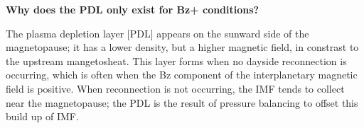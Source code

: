 \textbf{Why does the PDL only exist for Bz+ conditions?}

The plasma depletion layer [PDL] appears on the sunward side of the
magnetopause; it has a lower density, but a higher magnetic field, in
constrast to the upstream mangetosheat. This layer forms when no dayside
reconnection is occurring, which is often when the Bz component of the
interplanetary magnetic field is positive. When reconnection is not
occurring, the IMF tends to collect near the magnetopause; the PDL is
the result of pressure balancing to offset this build up of IMF.

